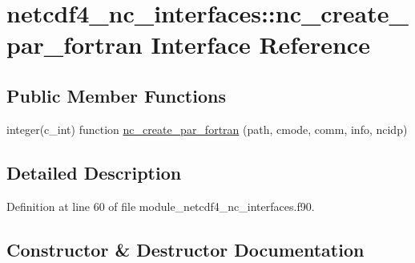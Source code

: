 \hypertarget{interfacenetcdf4__nc__interfaces_1_1nc__create__par__fortran}{}\section{netcdf4\+\_\+nc\+\_\+interfaces\+:\+:nc\+\_\+create\+\_\+par\+\_\+fortran Interface Reference}
\label{interfacenetcdf4__nc__interfaces_1_1nc__create__par__fortran}
\subsection*{Public Member Functions}
\begin{DoxyCompactItemize}
\item 
integer(c\+\_\+int) function \hyperlink{interfacenetcdf4__nc__interfaces_1_1nc__create__par__fortran_a4488a4f93dbd6cd81931028f3d091452}{nc\+\_\+create\+\_\+par\+\_\+fortran} (path, cmode, comm, info, ncidp)
\end{DoxyCompactItemize}


\subsection{Detailed Description}


Definition at line 60 of file module\+\_\+netcdf4\+\_\+nc\+\_\+interfaces.\+f90.



\subsection{Constructor \& Destructor Documentation}
\mbox{\label{interfacenetcdf4__nc__interfaces_1_1nc__create__par__fortran_a4488a4f93dbd6cd81931028f3d091452}} 
